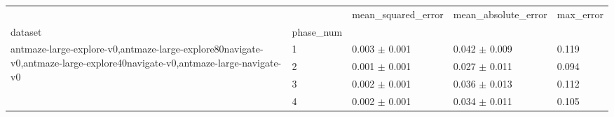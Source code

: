 \begin{tabular}{lllll}
\toprule
 &  & mean_squared_error & mean_absolute_error & max_error \\
dataset & phase_num &  &  &  \\
\midrule
\multirow[t]{4}{*}{antmaze-large-explore-v0,antmaze-large-explore80navigate-v0,antmaze-large-explore40navigate-v0,antmaze-large-navigate-v0} & 1 & 0.003 $\pm$ 0.001 & 0.042 $\pm$ 0.009 & 0.119 \\
 & 2 & 0.001 $\pm$ 0.001 & 0.027 $\pm$ 0.011 & 0.094 \\
 & 3 & 0.002 $\pm$ 0.001 & 0.036 $\pm$ 0.013 & 0.112 \\
 & 4 & 0.002 $\pm$ 0.001 & 0.034 $\pm$ 0.011 & 0.105 \\
\cline{1-5}
\bottomrule
\end{tabular}
